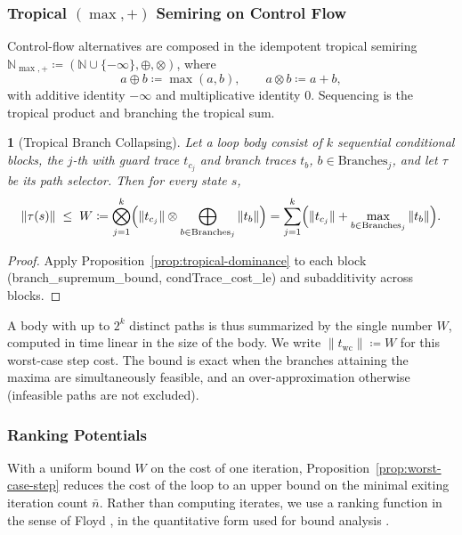 \documentclass[oneside,english]{amsart}
\numberwithin{equation}{section}
\numberwithin{figure}{section}
\theoremstyle{plain}
\theoremstyle{definition}
\theoremstyle{plain}
\newtheorem{prop}[thm]{\protect\propositionname}
\theoremstyle{remark}
\theoremstyle{plain}
\theoremstyle{definition}
\theoremstyle{plain}
\theoremstyle{remark}
\newcommand{\lean}[1]{{\ttfamily\small #1}}
\providecommand{\propositionname}{Proposition}
\begin{document}
\subsubsection{Tropical $(\max, +)$ Semiring on Control Flow}
\label{subsubsec:tropical-semiring}

Control-flow alternatives are composed in the idempotent tropical semiring \cite{baccelli1992synchronization}
$\mathbb{N}_{\max, +} \coloneqq (\mathbb{N} \cup \{-\infty\}, \oplus, \otimes)$, where
\[
a \oplus b \coloneqq \max(a, b), \qquad a \otimes b \coloneqq a + b,
\]
with additive identity $-\infty$ and multiplicative identity $0$. Sequencing is the tropical product and branching the tropical sum.

\begin{prop}[Tropical Branch Collapsing]\label{prop:tropical-collapse}
Let a loop body consist of $k$ sequential conditional blocks, the $j$-th with guard trace $t_{c_j}$ and branch traces $t_b$, $b \in \text{Branches}_j$, and let $\tau$ be its path selector. Then for every state $s$,
\[
\|\tau(s)\| \;\le\; W \coloneqq \bigotimes_{j=1}^k \Bigl( \|t_{c_j}\| \otimes \bigoplus_{b \in \text{Branches}_j} \|t_b\| \Bigr) = \sum_{j=1}^k \Bigl( \|t_{c_j}\| + \max_{b \in \text{Branches}_j} \|t_b\| \Bigr).
\]
\end{prop}

\begin{proof}
Apply Proposition~\ref{prop:tropical-dominance} to each block (\lean{branch\_\allowbreak supremum\_\allowbreak bound}, \lean{condTrace\_\allowbreak cost\_\allowbreak le}) and subadditivity across blocks.
\end{proof}

A body with up to $2^k$ distinct paths is thus summarized by the single number $W$, computed in time linear in the size of the body. We write $\|t_{\text{wc}}\| \coloneqq W$ for this worst-case step cost. The bound is exact when the branches attaining the maxima are simultaneously feasible, and an over-approximation otherwise (infeasible paths are not excluded).

\subsubsection{Ranking Potentials}
\label{subsubsec:ranking-potentials}

With a uniform bound $W$ on the cost of one iteration, Proposition~\ref{prop:worst-case-step} reduces the cost of the loop to an upper bound on the minimal exiting iteration count $\bar{n}$. Rather than computing iterates, we use a ranking function in the sense of Floyd \cite{floyd1967assigning}, in the quantitative form used for bound analysis \cite{alias2010multi,podelski2004complete}.
\end{document}
